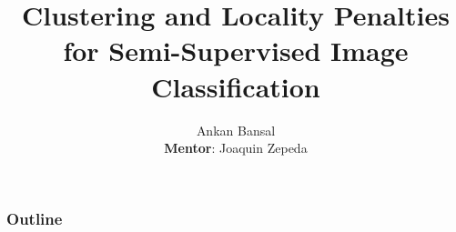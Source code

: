 \documentclass{beamer}
\title{Clustering and Locality Penalties for Semi-Supervised Image Classification}
\author{Ankan Bansal\\
\textbf{Mentor}: Joaquin Zepeda}
\date{}
\begin{document}
\begin{frame}[plain]
	\titlepage
\end{frame}

\begin{frame}[plain]
	\frametitle{Outline}
	\tableofcontents
\end{frame}



%

\end{document}
